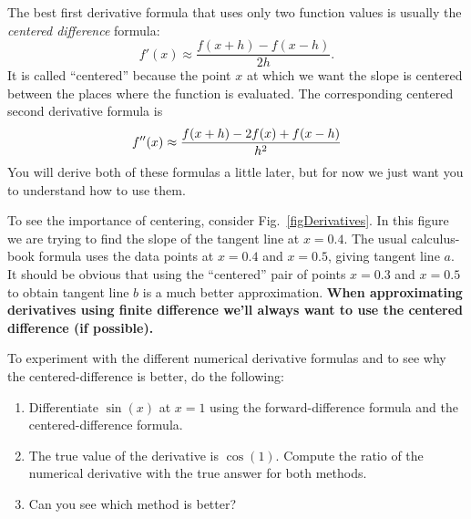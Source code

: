 The best first derivative formula that uses only two function values
is usually the {\it centered difference} formula: 
\begin{equation}\label{eq:CenteredDiff}
    f'(x) \approx \frac{f(x+h)-f(x-h)}{2h} .
\end{equation}
It is called ``centered'' because the point $x$ at which we want the
slope is centered between the places where the function is evaluated.
The corresponding centered second derivative formula is 
\begin{equation}\label{eq:seconderivative}
    f''(x) \approx {f(x+h)-2 f(x)+f(x-h) \over h^2}
\end{equation}
You will derive both of these formulas a little later, but for now we
just want you to understand how to use them.



  To see the importance of centering, consider
  Fig.~\ref{figDerivatives}. In this figure we are trying to find the
  slope of the tangent line at $x=0.4$.  The usual calculus-book
  formula uses the data points at $x=0.4$ and $x=0.5$, giving tangent
  line $a$. It should be obvious that using the ``centered'' pair of
  points $x=0.3$ and $x=0.5$ to obtain tangent line $b$ is a much
  better approximation. \textbf{When approximating derivatives using
  finite difference we'll always want to use the centered difference
  (if possible).}

\begin{enumerate}
\probtwo  To experiment with the different numerical derivative
formulas and to see why the centered-difference is better, do the
following:
\begin{enumerate}
\item Differentiate $\sin(x)$ at $x=1$ using the forward-difference
  formula and the centered-difference formula.
\item The true value of the derivative is $\cos(1)$.  Compute the
  ratio of the numerical derivative with the true answer for both
  methods.
\item Can you see which method is better?
\end{enumerate}
\end{enumerate}

